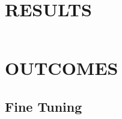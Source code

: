 \documentclass[a4paper, 10pt]{article}
\begin{document}
\section{RESULTS}


\begin{lstlisting}[language = C++]

\end{lstlisting}

%
%


\section{OUTCOMES}


\subsection{Fine Tuning} 

\end{document}
